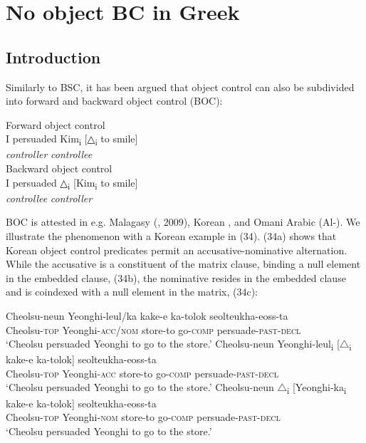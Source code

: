 \documentclass[output=paper]{langsci/langscibook}
\begin{document}
\section{No object BC in Greek} 

\subsection{Introduction}
Similarly to BSC, it has been argued that object control can also be subdivided into forward and backward object control (BOC):

\ea%
    \label{ex:alexiadou:33}
    \ea Forward object control\\
    \gll I persuaded   Kim\textsubscript{i}     [{△\textsubscript{i}} to smile]  \\
         {}   {}       \textit{controller}         \textit{controllee}\\
    \ex Backward object control\\
    \gll I persuaded  △\textsubscript{i}    [Kim\textsubscript{i}    to smile]  \\
        {}    {}       \textit{controllee}  \textit{controller}\\
        \z
\z

BOC is attested in e.g. Malagasy (\citealt{Potsdam2006}, 2009), Korean \citep{Monahan2003}, and Omani Arabic (Al-\citealt{Balushi2008}). We illustrate the phenomenon with a Korean example in (34). (34a) shows that Korean object control predicates permit an accusative-nominative alternation. While the accusative is a constituent of the matrix clause, binding a null element in the embedded clause, (34b), the nominative resides in the embedded clause and is coindexed with a null element in the matrix, (34c):
 
\ea%
    \label{ex:alexiadou:34}
    \ea\gll Cheolsu-neun  Yeonghi-leul/ka     kake-e    ka-tolok   seolteukha-eoss-ta\\
            Cheolsu-\textsc{top}     Yeonghi-\textsc{acc/nom}   store-to  go-\textsc{comp}   persuade-\textsc{past-decl}\\
    \glt    ‘Cheolsu persuaded Yeonghi to go to the store.’
    \ex
    \gll Cheolsu-neun Yeonghi-leul\textsubscript{i} [${\bigtriangleup}$\textsubscript{i} kake-e     ka-tolok]  seolteukha-eoss-ta\\
             Cheolsu-\textsc{top}    Yeonghi-\textsc{acc}    {}      store-to   go-\textsc{comp}   persuade-\textsc{past-decl}\\
    \glt     ‘Cheolsu persuaded Yeonghi to go to the store.’     
    \ex
    \gll Cheolsu-neun ${\bigtriangleup}$\textsubscript{i} [Yeonghi-ka\textsubscript{i}    kake-e    ka-tolok]  seolteukha-eoss-ta\\
             Cheolsu-\textsc{top}  {}       Yeonghi-\textsc{nom}    store-to  go-\textsc{comp}      persuade-\textsc{past-decl}\\
    \glt     ‘Cheolsu persuaded Yeonghi to go to the store.’ 
    \z
\z
\end{document}

